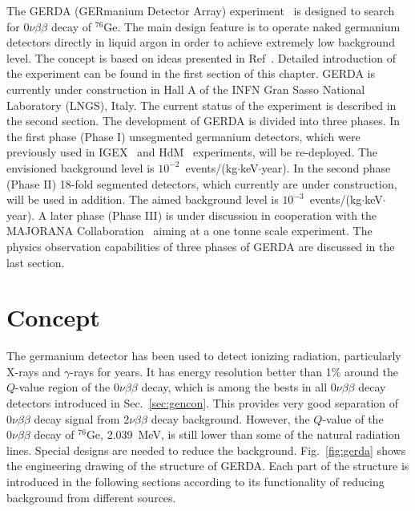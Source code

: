 The GERDA (GERmanium Detector Array) experiment~\cite{Sch05} is designed to search for $0\nu\beta\beta$ decay of $^{76}$Ge. The main design feature is to operate naked germanium detectors directly in liquid argon in order to achieve extremely low background level. The concept is based on ideas presented in Ref~\cite{Heu95}. Detailed introduction of the experiment can be found in the first section of this chapter. GERDA is currently under construction in Hall A of the INFN Gran Sasso National Laboratory (LNGS), Italy. The current status of the experiment is described in the second section. The development of GERDA is divided into three phases. In the first phase (Phase I) unsegmented germanium detectors, which were previously used in IGEX~\cite{Aal02} and HdM~\cite{Hei04} experiments, will be re-deployed. The envisioned background level is $10^{-2}$~events/(kg$\cdot$keV$\cdot$year). In the second phase (Phase II) 18-fold segmented detectors, which currently are under construction, will be used in addition. The aimed background level is $10^{-3}$~events/(kg$\cdot$keV$\cdot$year). A later phase (Phase III) is under discussion in cooperation with the MAJORANA Collaboration~\cite{Gai03,Aal04} aiming at a one tonne scale experiment. The physics observation capabilities of three phases of GERDA are discussed in the last section.

\section{Concept}
\label{sec:gerda:conc}
The germanium detector has been used to detect ionizing radiation, particularly X-rays and $\gamma$-rays for years. It has energy resolution better than 1\% around the $Q$-value region of the $0\nu\beta\beta$ decay, which is among the bests in all $0\nu\beta\beta$ decay detectors introduced in Sec.~\ref{sec:gencon}. This provides very good separation of $0\nu\beta\beta$ decay signal from $2\nu\beta\beta$ decay background. However, the $Q$-value of the $0\nu\beta\beta$ decay of $^{76}$Ge, 2.039~MeV, is still lower than some of the natural radiation lines. Special designs are needed to reduce the background. Fig.~\ref{fig:gerda} shows the engineering drawing of the structure of GERDA. Each part of the structure is introduced in the following sections according to its functionality of reducing background from different sources.

